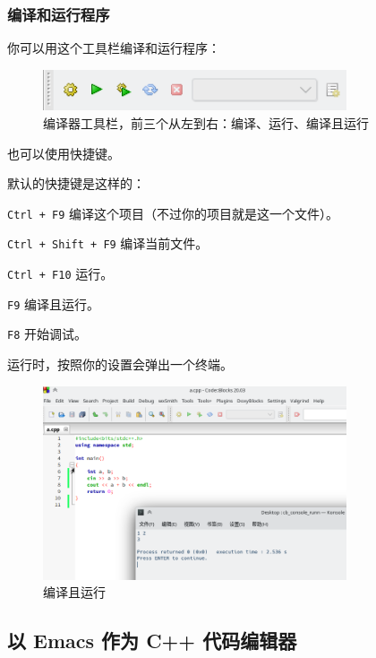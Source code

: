 \documentclass[UTF-8]{ctexart}
\begin{document}
			\subsubsection{编译和运行程序}
			
				你可以用这个工具栏编译和运行程序：
				
				\begin{figure}[H]
					\centering
					\includegraphics[width=0.8\textwidth]{fig/cb_dock_compile.png}
					\caption*{编译器工具栏，前三个从左到右：编译、运行、编译且运行}
				\end{figure}
			
				也可以使用快捷键。
				
				默认的快捷键是这样的：
				
				\texttt{Ctrl + F9} 编译这个项目（不过你的项目就是这一个文件）。
				
				\texttt{Ctrl + Shift + F9} 编译当前文件。
				
				\texttt{Ctrl + F10} 运行。
				
				\texttt{F9} 编译且运行。
				
				\texttt{F8} 开始调试。
				
				运行时，按照你的设置会弹出一个终端。
				
				\begin{figure}[H]
					\centering
					\includegraphics[width=0.8\textwidth]{fig/cb_run_success.png}
					\caption*{编译且运行}
				\end{figure}
		
		\newpage
			
		\subsection{以 Emacs 作为 C++ 代码编辑器}
		
\end{document}
